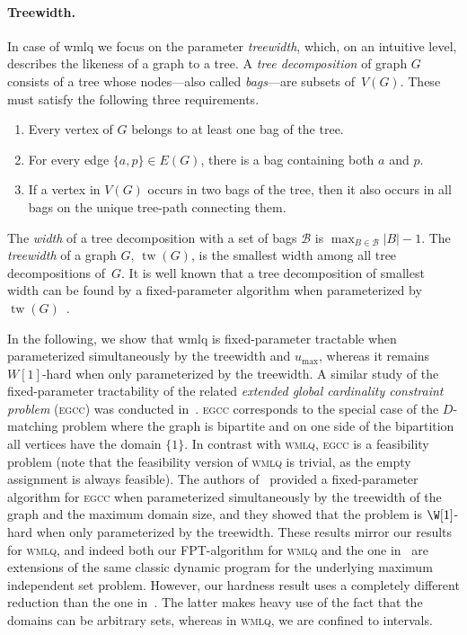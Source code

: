 \documentclass{llncs}
\newcommand{\tw}{\operatorname{tw}}
\begin{document}
\paragraph{Treewidth.}
In case of {\sc wmlq} we focus on the parameter \emph{treewidth}, which, on an intuitive level, describes the likeness of a graph to a tree.
A \emph{tree decomposition} of graph $G$ consists of a tree whose nodes---also called \emph{bags}---are subsets of~$V(G)$. These must satisfy the following three requirements.
\begin{enumerate}
\item Every vertex of $G$ belongs to at least one bag of the tree.
\item For every edge $\{a, p\} \in E(G)$, there is a bag containing both $a$ and $p$.
\item If a vertex in $V(G)$ occurs in two bags of the tree, then it also occurs in all bags on the unique tree-path connecting them.
\end{enumerate}
The \emph{width} of a tree decomposition with a set of bags $\mathcal{B}$ is $\max_{B \in \mathcal{B}} |B| - 1$.
The \emph{treewidth} of a graph $G$, $\tw(G)$, is the smallest width among all tree decompositions of~$G$. It is well known that a tree decomposition of smallest width can be found by a fixed-parameter algorithm when parameterized by $\tw(G)$~\cite{Bod96}.
\medskip

In the following, we show that {\sc wmlq} is fixed-parameter tractable when parameterized simultaneously by the treewidth and $u_{\max}$, whereas it remains $W[1]$-hard when only parameterized by the treewidth.
A similar study of the fixed-parameter tractability of the related \emph{extended global cardinality constraint problem} (\textsc{egcc}) was conducted in~\cite{SS11}.
\textsc{egcc} corresponds to the special case of the $D$-matching problem where the graph is bipartite and on one side of the bipartition all vertices have the domain $\{1\}$. In contrast with \textsc{wmlq}, \textsc{egcc} is a feasibility problem (note that the feasibility version of \textsc{wmlq} is trivial, as the empty assignment is always feasible).
 The authors of~\cite{SS11} provided a fixed-parameter algorithm for \textsc{egcc} when parameterized simultaneously by the treewidth of the graph and the maximum domain size, and they showed that the problem is $\W[1]$-hard when only parameterized by the treewidth. These results mirror our results for \textsc{wmlq}, and indeed both our FPT-algorithm for \textsc{wmlq} and the one in~\cite{SS11} are extensions of the same classic dynamic program for the underlying maximum independent set problem. However, our hardness result uses a completely different reduction than the one in~\cite{SS11}. The latter makes heavy use of the fact that the domains can be arbitrary sets, whereas in \textsc{wmlq}, we are confined to intervals.
\end{document}
